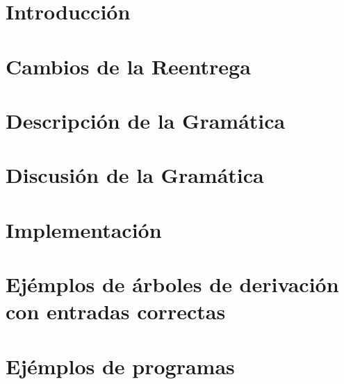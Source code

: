 \documentclass[10pt, a4paper]{article}
\begin{document}
	\maketitle
	\tableofcontents
	
	\newpage
	\section{Introducci\'on}
	
	
	\section{Cambios de la Reentrega}
	
	
	\section{Descripción de la Gramática}
	
	
	\newpage
	\section{Discusión de la Gramática}
	
	
	\newpage
	\section{Implementaci\'on}
	
	
	\newpage
	\section{Ej\'emplos de \'arboles de derivaci\'on con entradas correctas}
	
	
	
	\newpage
	\section{Ej\'emplos de programas}
	
	
	
\end{document}
